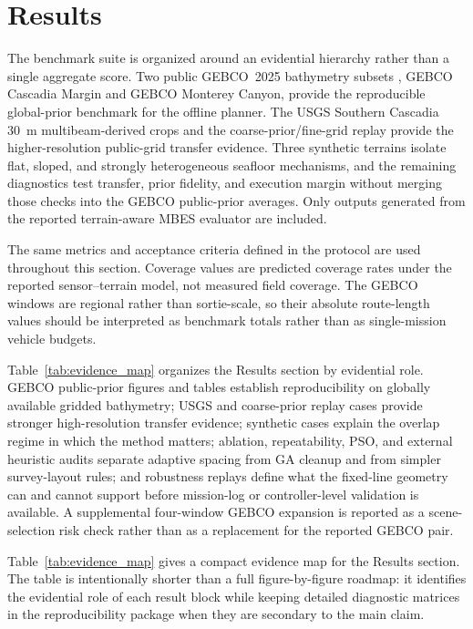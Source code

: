 \documentclass[jmse,article,submit,moreauthors]{Definitions/mdpi}
\begin{document}
\section{Results}
\label{sec:results}
The benchmark suite is organized around an evidential hierarchy rather than a single aggregate score. Two public GEBCO~2025 bathymetry subsets \cite{gebco2025grid}, GEBCO Cascadia Margin and GEBCO Monterey Canyon, provide the reproducible global-prior benchmark for the offline planner. The USGS Southern Cascadia 30~m multibeam-derived crops and the coarse-prior/fine-grid replay provide the higher-resolution public-grid transfer evidence. Three synthetic terrains isolate flat, sloped, and strongly heterogeneous seafloor mechanisms, and the remaining diagnostics test transfer, prior fidelity, and execution margin without merging those checks into the GEBCO public-prior averages. Only outputs generated from the reported terrain-aware MBES evaluator are included.

The same metrics and acceptance criteria defined in the protocol are used throughout this section. Coverage values are predicted coverage rates under the reported sensor--terrain model, not measured field coverage. The GEBCO windows are regional rather than sortie-scale, so their absolute route-length values should be interpreted as benchmark totals rather than as single-mission vehicle budgets.

Table~\ref{tab:evidence_map} organizes the Results section by evidential role. GEBCO public-prior figures and tables establish reproducibility on globally available gridded bathymetry; USGS and coarse-prior replay cases provide stronger high-resolution transfer evidence; synthetic cases explain the overlap regime in which the method matters; ablation, repeatability, PSO, and external heuristic audits separate adaptive spacing from GA cleanup and from simpler survey-layout rules; and robustness replays define what the fixed-line geometry can and cannot support before mission-log or controller-level validation is available. A supplemental four-window GEBCO expansion is reported as a scene-selection risk check rather than as a replacement for the reported GEBCO pair.

Table~\ref{tab:evidence_map} gives a compact evidence map for the Results section. The table is intentionally shorter than a full figure-by-figure roadmap: it identifies the evidential role of each result block while keeping detailed diagnostic matrices in the reproducibility package when they are secondary to the main claim.
\end{document}
